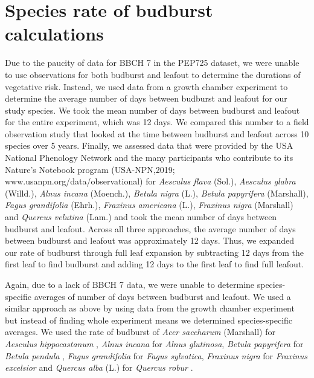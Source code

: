 \documentclass{article}\usepackage[]{graphicx}\usepackage[]{color}
\begin{document}
\section*{Species rate of budburst calculations}
Due to the paucity of data for BBCH 7 in the PEP725 dataset, we were unable to use observations for both budburst and leafout to determine the durations of vegetative risk. Instead, we used data from a growth chamber experiment \citep{Flynn2018} to determine the average number of days between budburst and leafout for our study species. We took the mean number of days between budburst and leafout for the entire experiment, which was 12 days. We compared this number to a field observation study \citep{Donnelly2017} that looked at the time between budburst and leafout across 10 species over 5 years. Finally, we assessed data that were provided by the USA National Phenology Network and the many participants who contribute to its Nature's Notebook program (USA-NPN,2019; www.usanpn.org/data/observational) for \textit{Aesculus flava} (Sol.), \textit{Aesculus glabra} (Willd.), \textit{Alnus incana} (Moench.), \textit{Betula nigra} (L.), \textit{Betula papyrifera} (Marshall), \textit{Fagus grandifolia} (Ehrh.), \textit{Fraxinus americana} (L.), \textit{Fraxinus nigra} (Marshall) and \textit{Quercus velutina} (Lam.) and took the mean number of days between budburst and leafout. Across all three approaches, the average number of days between budburst and leafout was approximately 12 days. Thus, we expanded our rate of budburst through full leaf expansion by subtracting 12 days from the first leaf to find budburst and adding 12 days to the first leaf to find full leafout. 

Again, due to a lack of BBCH 7 data, we were unable to determine species-specific averages of number of days between budburst and leafout. We used a similar approach as above by using data from the growth chamber experiment \citep{Flynn2018} but instead of finding whole experiment means we determined species-specific averages. We used the rate of budburst of \textit{Acer saccharum} (Marshall) for \textit{Aesculus hippocastanum} \citep{Buerki2010}, \textit{Alnus incana} for \textit{Alnus glutinosa}, \textit{Betula papyrifera} for \textit{Betula pendula} \citep{Wang2016}, \textit{Fagus grandifolia} for \textit{Fagus sylvatica}, \textit{Fraxinus nigra} for \textit{Fraxinus excelsior} and \textit{Quercus alba} (L.) for \textit{Quercus robur} \citep{Hipp2017}.

\end{document}
